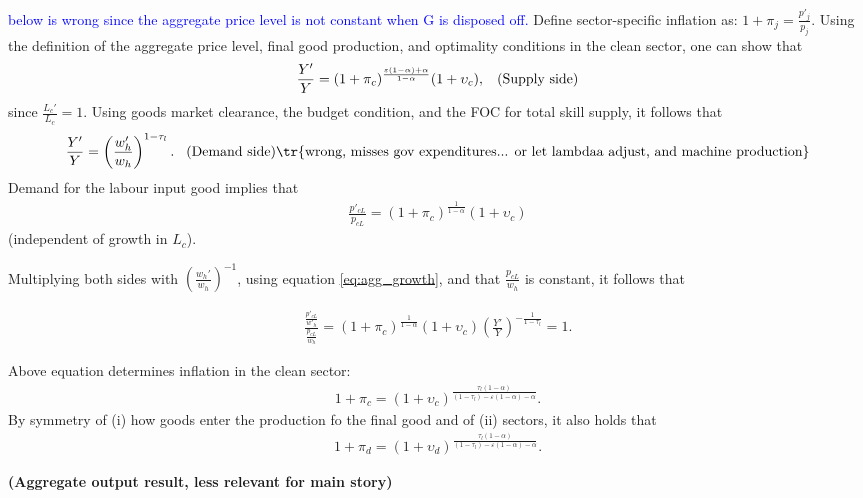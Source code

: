 \textcolor{blue}{below is wrong since the aggregate price level is not constant when G is disposed off.}
Define sector-specific inflation as: $1+\pi_{j}=\frac{p'_j}{p_j}$.
Using the definition of the aggregate price level, final good production, and optimality conditions in the clean sector, one can show that 
\begin{align}\label{eq:agg_supply}
\frac{Y'}{Y}= (1+\pi_c)^{\frac{\varepsilon(1-\alpha)+\alpha}{1-\alpha}}(1+\upsilon_{c}), \hspace{3mm} \text{(Supply side)}
\end{align}
since $\frac{L_{c}'}{L_c}=1$.
Using goods market clearance, the budget condition, and the FOC for total skill supply, it follows that 
\begin{align}\label{eq:agg_demand}
\frac{Y'}{Y}= \left(\frac{w'_h}{w_h}\right)^{1-\tau_l}. \hspace{3mm} \text{(Demand side)}\tr{\text{wrong, misses gov expenditures... or let lambdaa adjust, and machine production}}
\end{align}
Demand for the labour input good implies that 
\begin{align}\label{eq:labour income}
\frac{p'_{cL}}{p_{cL}}= (1+\pi_c)^\frac{1}{1-\alpha}(1+\upsilon_{c})
\end{align}
(independent of growth in $L_c$).

Multiplying both sides with $\left(\frac{w_h'}{w_h}\right)^{-1}$, using equation \ref{eq:agg_growth}, and that $\frac{p_{cL}}{w_h}$ is constant, it follows that 

\begin{align}
\frac{\frac{p'_{cL}}{w'_h}}{\frac{p_{cL}}{w_h}}= (1+\pi_c)^\frac{1}{1-\alpha}(1+\upsilon_{c})\left(\frac{Y'}{Y}\right)^{-\frac{1}{1-\tau_l}}=1.
\end{align}

Above equation determines inflation in the clean sector:
\begin{align}\label{eq:inf_c}
1+\pi_c=(1+\upsilon_{c})^{\frac{\tau_l(1-\alpha)}{(1-\tau_l)-\varepsilon(1-\alpha)-\alpha}}.
\end{align}
By symmetry of (i) how goods enter the production fo the final good and of (ii) sectors, it also holds that 
\begin{align}\label{eq:inf_d}
1+\pi_d=(1+\upsilon_{d})^{\frac{\tau_l(1-\alpha)}{(1-\tau_l)-\varepsilon(1-\alpha)-\alpha}}.
\end{align}


\noindent \textbf{(Aggregate output result, less relevant for main story)}

